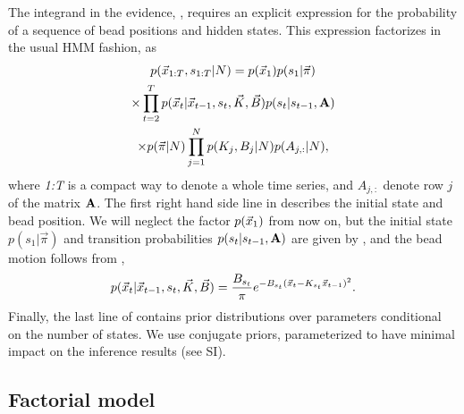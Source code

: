 The integrand in the evidence, , requires an
explicit expression for the probability of a sequence of bead
positions and hidden states. This expression factorizes in the usual
HMM fashion, as
\begin{multline}\label{eq:evidencintegrand}
 p(\x_{1:T},s_{1:T}|N)%
=
p(\x_1)p(s_1|\vec{\pi})\\
\times
\prod_{t=2}^{T}p(\x_t|\x_{t-1},s_t,\vec{K},\vec{B})p(s_t|s_{t-1},\matris{A})\\
\times
p(\vec{\pi}|N)
\prod_{j=1}^Np(K_j,B_j|N)p(A_{j,:}|N),
\end{multline}
where \mbox{\textit{1:T}} is a compact way to denote a whole time
series, and $A_{j,:}$ denote row $j$ of the matrix $\mathbf{A}$.  The
first right hand side line in  describes the
initial state and bead position. We will neglect the factor $p(\vec{x}_1)$
from now on, but the initial state $p(s_1|\vec\pi)$ and transition
probabilities $p(s_t|s_{t-1},\mathbf{A})$ are given by
, and the bead motion follows from ,
\begin{equation}
 p(\vec{x}_t|\vec{x}_{t-1},s_t,\vec{K},\vec{B})
 =\frac{B_{s_t}}{\pi}
 e^{-B_{s_t}(\vec{x}_t-K_{s_t}\vec{x}_{t-1})^2}.
\end{equation}
Finally, the last line of  contains prior
distributions over parameters conditional on the number of states. We
use conjugate priors, parameterized to have minimal impact on the
inference results (see SI).

\subsection{Factorial model}
\cite{vbTPM_model:describefactorialmodel}
